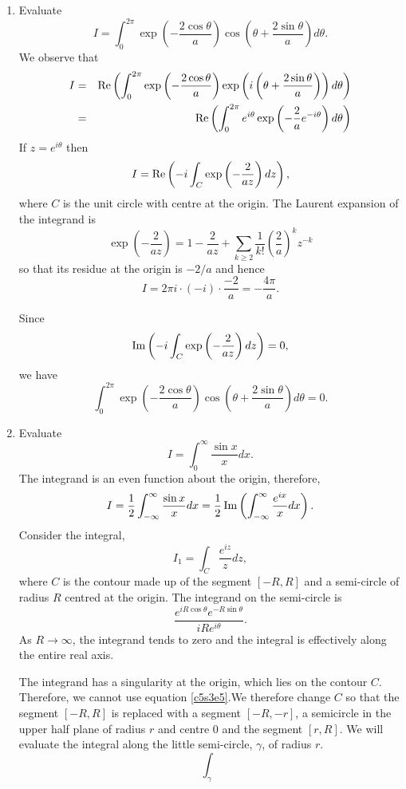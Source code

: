 \begin{enumerate}
\item Evaluate 
\[
I = \int_0^{2\pi}\exp\left(-\frac{2\cos\theta}{a}\right)
\cos\left(\theta + \frac{2\sin\theta}{a}\right)d\theta.
\]
We observe that
\begin{eqnarray*}
I &=& \operatorname{Re}\left(\int_0^{2\pi}\exp\left(-\frac{2\cos\theta}{a}\right)
\exp\left(i\left(\theta + \frac{2\sin\theta}{a}\right)\right)d\theta\right) \\
 &=& \operatorname{Re}\left(\int_0^{2\pi}e^{i\theta}\exp\left(-\frac{2}{a}e^{-i\theta}\right)d\theta\right)
\end{eqnarray*}
If $z = e^{i\theta}$ then
\[
I = \operatorname{Re}\left(-i\int_C\exp\left(-\frac{2}{az}\right) dz \right),
\]
where $C$ is the unit circle with centre at the origin. The Laurent expansion of
the integrand is
\[
\exp\left(-\frac{2}{az}\right) = 1 - \frac{2}{az} + \sum_{k \ge 2}\frac{1}{k!}\left(\frac{2}{a}\right)^kz^{-k}
\]
so that its residue at the origin is $-2/a$ and hence
\[
I = 2\pi i \cdot (-i) \cdot \frac{-2}{a} = -\frac{4\pi}{a}.
\]

Since
\[
\operatorname{Im}\left(-i\int_C\exp\left(-\frac{2}{az}\right) dz \right) = 0,
\]
we have
\[
\int_0^{2\pi}\exp\left(-\frac{2\cos\theta}{a}\right)
\cos\left(\theta + \frac{2\sin\theta}{a}\right)d\theta = 0.
\]

\item Evaluate
\[
I = \int_0^\infty \frac{\sin x}{x}dx.
\]
The integrand is an even function about the origin, therefore,
\[
I = \frac{1}{2}\int_{-\infty}^\infty \frac{\sin x}{x}dx =
\frac{1}{2}\operatorname{Im}\left(\int_{-\infty}^\infty \frac{e^{ix}}{x}dx\right).
\]
Consider the integral,
\[
I_1 = \int_C \frac{e^{iz}}{z}dz,
\]
where $C$ is the contour made up of the segment $[-R, R]$ and a semi-circle of
radius $R$ centred at the origin. The integrand on the semi-circle is
\[
\frac{e^{iR\cos\theta}e^{-R\sin\theta}}{iRe^{i\theta}}.
\]
As $R \rightarrow \infty$, the integrand tends to zero and the integral is
effectively along the entire real axis.

The integrand has a singularity at the origin, which lies on the contour $C$.
Therefore, we cannot use equation \eqref{c5s3e5}.We therefore change $C$ so that
the segment $[-R, R]$ is replaced with a segment $[-R, -r]$, a semicircle in
the upper half plane of radius $r$ and centre $0$ and the segment $[r, R]$. We
will evaluate the integral along the little semi-circle, $\gamma$, of radius $r$.
\[
\int_\gamma 
\]
\end{enumerate}
 